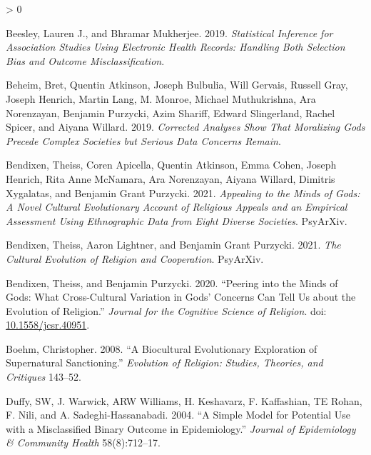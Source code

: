 \documentclass[
]{article}
\newlength{\cslhangindent}
\newenvironment{CSLReferences}[2] %
 {%
  \setlength{\parindent}{0pt}
  \ifodd #1 \everypar{\setlength{\hangindent}{\cslhangindent}}\ignorespaces\fi
  \ifnum #2 > 0
  \setlength{\parskip}{#2\baselineskip}
  \fi
 }%
 {}
\begin{document}
\hypertarget{refs}{}
\begin{CSLReferences}{1}{0}
\leavevmode\hypertarget{ref-beesleyStatisticalInferenceAssociation2019}{}%
Beesley, Lauren J., and Bhramar Mukherjee. 2019. \emph{Statistical Inference for Association Studies Using Electronic Health Records: Handling Both Selection Bias and Outcome Misclassification}.

\leavevmode\hypertarget{ref-beheimCorrectedAnalysesShow2019}{}%
Beheim, Bret, Quentin Atkinson, Joseph Bulbulia, Will Gervais, Russell Gray, Joseph Henrich, Martin Lang, M. Monroe, Michael Muthukrishna, Ara Norenzayan, Benjamin Purzycki, Azim Shariff, Edward Slingerland, Rachel Spicer, and Aiyana Willard. 2019. \emph{Corrected Analyses Show That Moralizing Gods Precede Complex Societies but Serious Data Concerns Remain}.

\leavevmode\hypertarget{ref-bendixenAppealingMindsGods2021}{}%
Bendixen, Theiss, Coren Apicella, Quentin Atkinson, Emma Cohen, Joseph Henrich, Rita Anne McNamara, Ara Norenzayan, Aiyana Willard, Dimitris Xygalatas, and Benjamin Grant Purzycki. 2021. \emph{Appealing to the Minds of Gods: {A} Novel Cultural Evolutionary Account of Religious Appeals and an Empirical Assessment Using Ethnographic Data from Eight Diverse Societies}. PsyArXiv.

\leavevmode\hypertarget{ref-bendixenCulturalEvolutionReligion2021}{}%
Bendixen, Theiss, Aaron Lightner, and Benjamin Grant Purzycki. 2021. \emph{The {Cultural} {Evolution} of {Religion} and {Cooperation}}. PsyArXiv.

\leavevmode\hypertarget{ref-bendixenPeeringMindsGods2020}{}%
Bendixen, Theiss, and Benjamin Purzycki. 2020. {``Peering into the {Minds} of {Gods}: {What} {Cross}-{Cultural} {Variation} in {Gods}' {Concerns} {Can} {Tell} {Us} about the {Evolution} of {Religion}.''} \emph{Journal for the Cognitive Science of Religion}. doi: \href{https://doi.org/10.1558/jcsr.40951}{10.1558/jcsr.40951}.

\leavevmode\hypertarget{ref-boehm2008biocultural}{}%
Boehm, Christopher. 2008. {``A Biocultural Evolutionary Exploration of Supernatural Sanctioning.''} \emph{Evolution of Religion: Studies, Theories, and Critiques} 143--52.

\leavevmode\hypertarget{ref-duffy2004simple}{}%
Duffy, SW, J. Warwick, ARW Williams, H. Keshavarz, F. Kaffashian, TE Rohan, F. Nili, and A. Sadeghi-Hassanabadi. 2004. {``A Simple Model for Potential Use with a Misclassified Binary Outcome in Epidemiology.''} \emph{Journal of Epidemiology \& Community Health} 58(8):712--17.


\end{CSLReferences}
\end{document}
